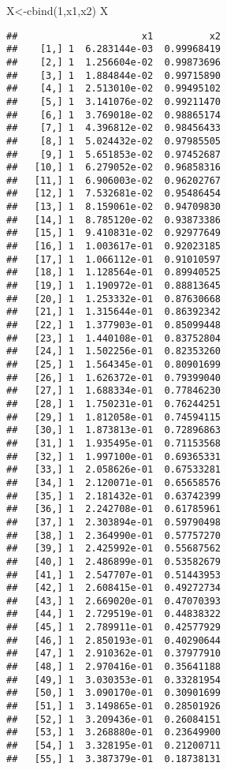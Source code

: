 \documentclass[
  12pt,
]{article}
\newenvironment{Shaded}{\begin{snugshade}}{\end{snugshade}}
\newcommand{\DecValTok}[1]{\textcolor[rgb]{0.00,0.00,0.81}{#1}}
\newcommand{\FunctionTok}[1]{\textcolor[rgb]{0.00,0.00,0.00}{#1}}
\newcommand{\NormalTok}[1]{#1}
\newcommand{\OtherTok}[1]{\textcolor[rgb]{0.56,0.35,0.01}{#1}}
\begin{document}
\begin{Shaded}
\begin{Highlighting}[]
\NormalTok{X}\OtherTok{\textless{}{-}}\FunctionTok{cbind}\NormalTok{(}\DecValTok{1}\NormalTok{,x1,x2)}
\NormalTok{X}
\end{Highlighting}
\end{Shaded}

\begin{verbatim}
##                      x1          x2
##    [1,] 1  6.283144e-03  0.99968419
##    [2,] 1  1.256604e-02  0.99873696
##    [3,] 1  1.884844e-02  0.99715890
##    [4,] 1  2.513010e-02  0.99495102
##    [5,] 1  3.141076e-02  0.99211470
##    [6,] 1  3.769018e-02  0.98865174
##    [7,] 1  4.396812e-02  0.98456433
##    [8,] 1  5.024432e-02  0.97985505
##    [9,] 1  5.651853e-02  0.97452687
##   [10,] 1  6.279052e-02  0.96858316
##   [11,] 1  6.906003e-02  0.96202767
##   [12,] 1  7.532681e-02  0.95486454
##   [13,] 1  8.159061e-02  0.94709830
##   [14,] 1  8.785120e-02  0.93873386
##   [15,] 1  9.410831e-02  0.92977649
##   [16,] 1  1.003617e-01  0.92023185
##   [17,] 1  1.066112e-01  0.91010597
##   [18,] 1  1.128564e-01  0.89940525
##   [19,] 1  1.190972e-01  0.88813645
##   [20,] 1  1.253332e-01  0.87630668
##   [21,] 1  1.315644e-01  0.86392342
##   [22,] 1  1.377903e-01  0.85099448
##   [23,] 1  1.440108e-01  0.83752804
##   [24,] 1  1.502256e-01  0.82353260
##   [25,] 1  1.564345e-01  0.80901699
##   [26,] 1  1.626372e-01  0.79399040
##   [27,] 1  1.688334e-01  0.77846230
##   [28,] 1  1.750231e-01  0.76244251
##   [29,] 1  1.812058e-01  0.74594115
##   [30,] 1  1.873813e-01  0.72896863
##   [31,] 1  1.935495e-01  0.71153568
##   [32,] 1  1.997100e-01  0.69365331
##   [33,] 1  2.058626e-01  0.67533281
##   [34,] 1  2.120071e-01  0.65658576
##   [35,] 1  2.181432e-01  0.63742399
##   [36,] 1  2.242708e-01  0.61785961
##   [37,] 1  2.303894e-01  0.59790498
##   [38,] 1  2.364990e-01  0.57757270
##   [39,] 1  2.425992e-01  0.55687562
##   [40,] 1  2.486899e-01  0.53582679
##   [41,] 1  2.547707e-01  0.51443953
##   [42,] 1  2.608415e-01  0.49272734
##   [43,] 1  2.669020e-01  0.47070393
##   [44,] 1  2.729519e-01  0.44838322
##   [45,] 1  2.789911e-01  0.42577929
##   [46,] 1  2.850193e-01  0.40290644
##   [47,] 1  2.910362e-01  0.37977910
##   [48,] 1  2.970416e-01  0.35641188
##   [49,] 1  3.030353e-01  0.33281954
##   [50,] 1  3.090170e-01  0.30901699
##   [51,] 1  3.149865e-01  0.28501926
##   [52,] 1  3.209436e-01  0.26084151
##   [53,] 1  3.268880e-01  0.23649900
##   [54,] 1  3.328195e-01  0.21200711
##   [55,] 1  3.387379e-01  0.18738131

\end{verbatim}
\end{document}

